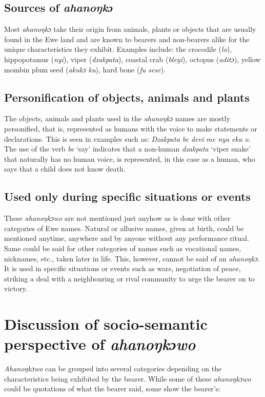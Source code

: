 \documentclass[output=paper]{langscibook}
\begin{document}
\subsection{Sources of {\textit{ahanoŋkɔ}}}
Most {\textit{ahanoŋkɔ}} take their origin from animals, plants or objects that are usually found in the Ewe land and are known to bearers and non-bearers alike for the unique characteristics they exhibit. Examples include: the crocodile ({\textit{lo}}), hippopotamus ({\textit{nyi}}), viper ({\textit{dzakpata}}), coastal crab ({\textit{bleyi}}), octopus ({\textit{aditɔ}}), yellow mombin plum seed ({\textit{akukɔ ku}}), hard bone ({\textit{ƒu sese}}).

\subsection{Personification of objects, animals and plants}
The objects, animals and plants used in the {\textit{ahanoŋkɔ}} names are mostly personified, that is, represented as humans with the voice to make statements or declarations. This is seen in examples such as: \textit{Dzakpata be devi me nya eku o}. The use of the verb \textit{be} `say' indicates that a non-human \textit{dzakpata} `viper snake' that naturally has no human voice, is represented, in this case as a human, who says that a child does not know death.

\subsection{Used only during specific situations or events}
These {\textit{ahanoŋkɔwo}} are not mentioned just anyhow as is done with other categories of Ewe names. Natural or allusive names, given at birth, could be mentioned anytime, anywhere and by anyone without any performance ritual. Same could be said for other categories of names such as vocational names, nicknames, etc., taken later in life. This, however, cannot be said of an {\textit{ahanoŋkɔ}}. It is used in specific situations or events such as wars, negotiation of peace, striking a deal with a neighbouring or rival community to urge the bearer on to victory.



\section{ Discussion of socio-semantic perspective of {\textit{ahanoŋkɔwo}}}
{\textit{Ahanoŋkɔwo}} can be grouped into several categories depending on the characteristics being exhibited by the bearer. While some of these {\textit{ahanoŋkɔwo}} could be quotations of what the bearer said, some show the bearer’s:
\end{document}
